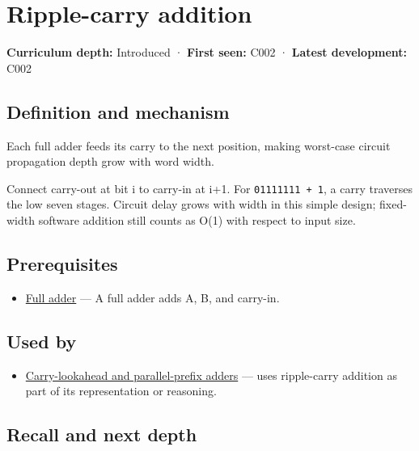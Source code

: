 \hypertarget{appendix-17917d9fdbe3}{}
\section{Ripple-carry addition}\label{appendix-17917d9fdbe3-ripple-carry-addition}

\textbf{Curriculum depth:} Introduced · \textbf{First seen:} C002 · \textbf{Latest development:} C002

\subsection{Definition and mechanism}\label{appendix-17917d9fdbe3-definition-and-mechanism}

Each full adder feeds its carry to the next position, making worst-case circuit propagation depth grow with word width.

Connect carry-out at bit i to carry-in at i+1. For \texttt{01111111\ +\ 1}, a carry traverses the low seven stages. Circuit delay grows with width in this simple design; fixed-width software addition still counts as O(1) with respect to input size.

\subsection{Prerequisites}\label{appendix-17917d9fdbe3-prerequisites}

\begin{itemize}
\tightlist
\item
  \hyperref[appendix-d1a5b1e520c2]{Full adder} --- A full adder adds A, B, and carry-in.
\end{itemize}

\subsection{Used by}\label{appendix-17917d9fdbe3-used-by}

\begin{itemize}
\tightlist
\item
  \hyperref[appendix-b5c46b2d94ff]{Carry-lookahead and parallel-prefix adders} --- uses ripple-carry addition as part of its representation or reasoning.
\end{itemize}

\subsection{Recall and next depth}\label{appendix-17917d9fdbe3-recall-and-next-depth}

